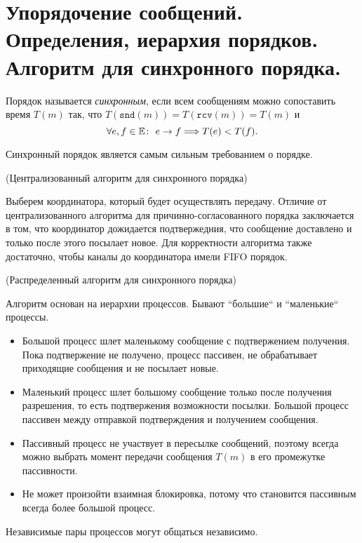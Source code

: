\section{Упорядочение сообщений. Определения, иерархия порядков. Алгоритм для синхронного порядка.}

\begin{definition}
    Порядок называется \textit{синхронным}, если всем сообщениям можно сопоставить время $T(m)$ так, что $T(\texttt{snd}(m)) = T(\texttt{rcv}(m)) = T(m)$ и
    \[
        \forall e,f \in \mathbb{E} \colon~ e \rightarrow f
        \Longrightarrow T(e) < T(f)
    .\]
\end{definition}

\begin{remark}
    Синхронный порядок является самым сильным требованием о порядке.
\end{remark}

\begin{algorithm}(Централизованный алгоритм для синхронного порядка)

    Выберем координатора, который будет осуществлять передачу. Отличие от централизованного алгоритма для причинно-согласованного порядка заключается в том, что координатор дожидается подтвержедния, что сообщение доставлено и только после этого посылает новое. Для корректности алгоритма также достаточно, чтобы каналы до координатора имели FIFO порядок.
\end{algorithm}

\begin{algorithm}(Распределенный алгоритм для синхронного порядка)

    Алгоритм основан на иерархии процессов. Бывают ``большие`` и ``маленькие`` процессы.
    \begin{itemize}
        \item Большой процесс шлет маленькому сообщение с подтвержением получения. Пока подтвержение не получено, процесс пассивен, не обрабатывает приходящие сообщения и не посылает новые.
        \item Маленький процесс шлет большому сообщение только после получения разрешения, то есть подтвержения возможности посылки. Большой процесс пассивен между отправкой подтверждения и получением сообщения.
        \item Пассивный процесс не участвует в пересылке сообщений, поэтому всегда можно выбрать момент передачи сообщения $T(m)$ в его промежутке пассивности.
        \item Не может произойти взаимная блокировка, потому что становится пассивным всегда более большой процесс.
    \end{itemize}

\end{algorithm}

\begin{remark}
    Независимые пары процессов могут общаться независимо.
\end{remark}
